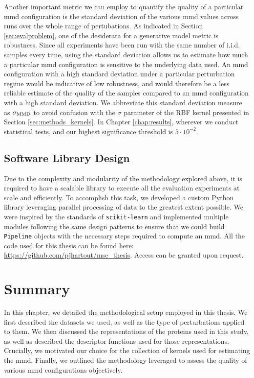 Another important metric we can employ to quantify the quality of a particular
\gls{mmd} configuration is the standard deviation of the various
\gls{mmd} values across runs over the whole range of pertubations. As
indicated in Section \ref{sec:evalproblem}, one of the desiderata for a
generative model metric is robustness. Since all experiments have been run with
the same number of i.i.d. samples every time, using the standard deviation
allows us to estimate how much a particular \gls{mmd} configuration is sensitive
to the underlying data used. An \gls{mmd} configuration with a high standard
deviation under a particular perturbation regime would be indicative of low
robustness, and would therefore be a less reliable estimate of the quality of
the samples compared to an \gls{mmd} configuration with a high standard
deviation. We abbreviate this standard deviation measure as $\sigma_{\text{MMD}}$ to
avoid confusion with the $\sigma$ parameter of the RBF kernel presented in
Section \ref{sec:methods_kernels}. In Chapter \ref{chap:results}, wherever we
conduct statistical tests, and our highest significance threshold is $5\cdot 10^{-2}$.


\subsection{Software Library Design}

Due to the complexity and modularity of the methodology explored above, it is
required to have a scalable library to execute all the evaluation experiments at
scale and efficiently. To accomplish this task, we developed a custom Python
library leveraging parallel processing of data to the greatest extent possible.
We were inspired by the standards of \texttt{scikit-learn} and implemented
multiple modules following the same design patterns to ensure that we could
build \texttt{Pipeline} objects with the necessary steps required to compute an
\gls{mmd}. All the code used for this thesis can be found here:
\url{https://github.com/pjhartout/msc_thesis}. Access can be granted upon request.

\section{Summary}

In this chapter, we detailed the methodological setup employed in this thesis.
We first described the datasets we used, as well as the type of perturbations
applied to them. We then discussed the representations of the proteins used in
this study, as well as described the descriptor functions used for those
representations. Crucially, we motivated our choice for the collection of
kernels used for estimating the \gls{mmd}. Finally, we outlined the
methodology leveraged to assess the quality of various \gls{mmd}
configurations objectively.
